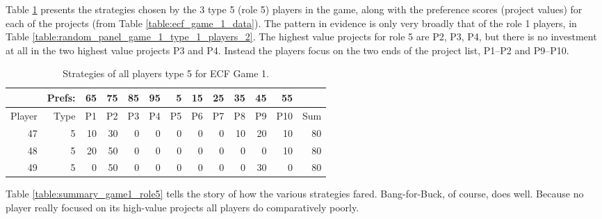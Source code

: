 \documentclass[11pt, oneside]{article}   	%
\begin{document}
Table \ref{table:random_panel_game_1_type_5_players} presents the strategies chosen by the
3 type 5 (role 5) players in the game, along with  the preference scores (project values) for each of the projects (from Table \ref{table:ecf_game_1_data}). The pattern in evidence is only very broadly that of the role 1 players, in Table \ref{table:random_panel_game_1_type_1_players_2}. 
The highest value projects for role 5 are P2, P3, P4, but there is no investment at all in the two highest value projects P3 and P4. Instead the players focus on the two ends of the project list, P1--P2 and P9--P10.
 \begin{table}[h]
 \figtop
 
 \centering
\begin{tabular}{rrrrrrrrrrrrr}
& Prefs: & 65 & 75 & 85 & 95 & 5 & 15 & 25 & 35 & 45 & 55 \\ \hline
Player & Type & P1 & P2 & P3 & P4 & P5 & P6 & P7 & P8 & P9 & P10 & Sum \\ \hline
47 & 5 & 10 & 30 & 0 & 0 & 0 & 0 & 0 & 10 & 20 & 10 & 80 \\ 
48 & 5 & 20 & 50 & 0 & 0 & 0 & 0 & 0 & 0 & 0 & 10 & 80 \\ 
49 & 5 & 0 & 50 & 0 & 0 & 0 & 0 & 0 & 0 & 30 & 0 & 80 \\ 
\end{tabular}
 \caption{Strategies of all players type 5 for ECF Game 1.}
 \label{table:random_panel_game_1_type_5_players}
 \figbot
\end{table}

Table \ref{table:summary_game1_role5} tells the story of how the various strategies fared. Bang-for-Buck, of course, does  well. Because no player really focused on its high-value projects all players do comparatively poorly.
\end{document}
